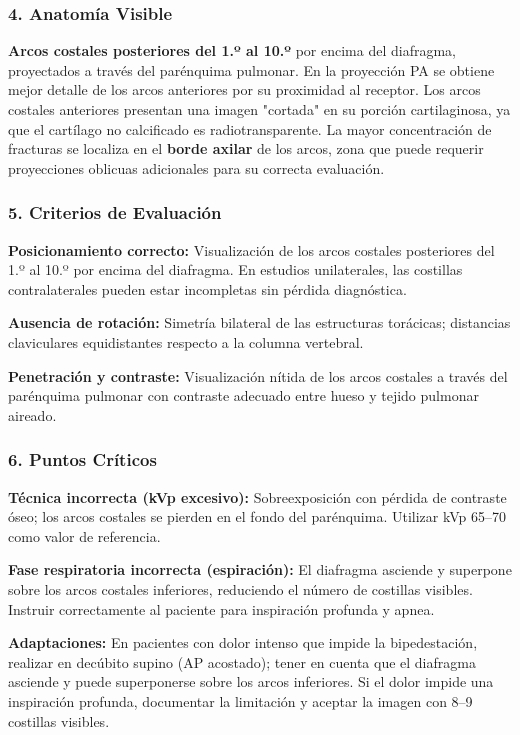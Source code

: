 	\subsubsection*{4. Anatomía Visible}
	
	\textbf{Arcos costales posteriores del 1.º al 10.º} por encima del diafragma, proyectados a través del parénquima pulmonar. En la proyección PA se obtiene mejor detalle de los arcos anteriores por su proximidad al receptor. Los arcos costales anteriores presentan una imagen "cortada" en su porción cartilaginosa, ya que el cartílago no calcificado es radiotransparente. La mayor concentración de fracturas se localiza en el \textbf{borde axilar} de los arcos, zona que puede requerir proyecciones oblicuas adicionales para su correcta evaluación.
	
	\subsubsection*{5. Criterios de Evaluación}
	
	\textbf{Posicionamiento correcto:} Visualización de los arcos costales posteriores del 1.º al 10.º por encima del diafragma. En estudios unilaterales, las costillas contralaterales pueden estar incompletas sin pérdida diagnóstica.
	
	\textbf{Ausencia de rotación:} Simetría bilateral de las estructuras torácicas; distancias claviculares equidistantes respecto a la columna vertebral.
	
	\textbf{Penetración y contraste:} Visualización nítida de los arcos costales a través del parénquima pulmonar con contraste adecuado entre hueso y tejido pulmonar aireado.
	
	\subsubsection*{6. Puntos Críticos}
	
	\textbf{Técnica incorrecta (kVp excesivo):} Sobreexposición con pérdida de contraste óseo; los arcos costales se pierden en el fondo del parénquima. Utilizar kVp 65--70 como valor de referencia.
	
	\textbf{Fase respiratoria incorrecta (espiración):} El diafragma asciende y superpone sobre los arcos costales inferiores, reduciendo el número de costillas visibles. Instruir correctamente al paciente para inspiración profunda y apnea.
	
	\textbf{Adaptaciones:} En pacientes con dolor intenso que impide la bipedestación, realizar en decúbito supino (AP acostado); tener en cuenta que el diafragma asciende y puede superponerse sobre los arcos inferiores. Si el dolor impide una inspiración profunda, documentar la limitación y aceptar la imagen con 8--9 costillas visibles.
	
